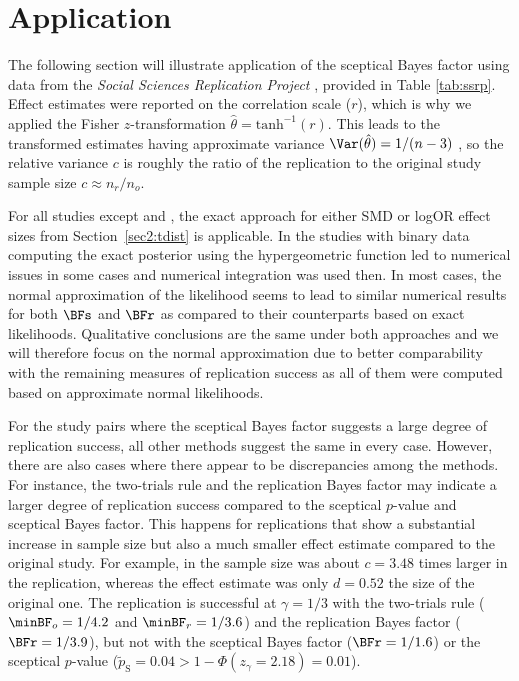 \section{Application}
\label{sec2:applications}
The following section will illustrate application of the sceptical Bayes factor
using data from the \emph{Social Sciences Replication Project}
\citep{Camerer2018}, provided in Table \ref{tab:ssrp}. Effect estimates were
reported on the correlation scale ($r$), which is why we applied the Fisher
$z$-transformation $\hat{\theta} = \text{tanh}^{-1}(r)$. This leads to the
transformed estimates having approximate variance
$\Var(\hat{\theta}) = 1/(n - 3)$ \citep{Fisher1921}, so the relative variance
$c$ is roughly the ratio of the replication to the original study sample size
$c \approx n_{r}/n_{o}$.

For all studies except \citet{Janssen2010} and \citet{Derex2013}, the exact
approach for either SMD or logOR effect sizes from Section~\ref{sec2:tdist} is
applicable. In the studies with binary data
computing the exact posterior using the hypergeometric function led to numerical
issues in some cases and numerical integration was used then.
In most cases, the normal approximation of the likelihood seems to lead to
similar numerical results for both $\BFs$ and $\BFr$ as compared to their
counterparts based on exact likelihoods. Qualitative conclusions are the same
under both approaches and we will therefore focus on the normal approximation
due to better comparability with the remaining measures of replication success
as all of them were computed based on approximate normal likelihoods.


For the study pairs where the sceptical Bayes factor suggests a large degree of
replication success, all other methods suggest the same in every case. However,
there are also cases where there appear to be discrepancies among the methods.
For instance, the two-trials rule and the replication Bayes factor may indicate
a larger degree of replication success compared to the sceptical $p$-value and
sceptical Bayes factor. This happens for replications that show a substantial
increase in sample size but also a much smaller effect estimate compared to the
original study. For example, in \citet{Balafoutas2012} the sample size was about
$c = 3.48$ times larger in the replication, whereas the effect estimate was only
$d = 0.52$ the size of the original one. The replication is successful at
$\gamma = 1/3$ with the two-trials rule ($\minBF_{o} = 1/4.2$ and
$\minBF_{r} = 1/3.6$) and the replication Bayes factor ($\BFr = 1/3.9$), but not
with the sceptical Bayes factor ($\BFr = 1/1.6$) or the sceptical $p$-value
($\tilde{p}_{\mathrm{S}} = 0.04 > 1 - \Phi(z_\gamma = 2.18) = 0.01$).


